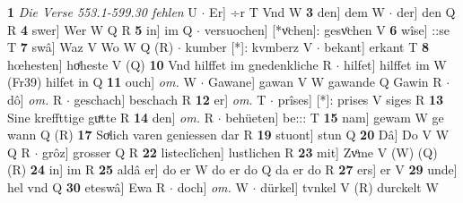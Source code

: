 \documentclass[8pt,a4paper,notitlepage]{article}
\begin{document}
\begin{table}[ht]
\begin{minipage}[t]{0.5\linewidth}
\textbf{1} \textit{Die Verse 553.1-599.30 fehlen} U   $\cdot$ Er] ÷r T Vnd W \textbf{3} den] dem W  $\cdot$ der] den Q R \textbf{4} swer] Wer W Q R \textbf{5} in] im Q  $\cdot$ versuochen] [*vͦchen]: gesvͦchen V \textbf{6} wîse] ::se T \textbf{7} swâ] Waz V Wo W Q (R)  $\cdot$ kumber [*]: kvmberz V  $\cdot$ bekant] erkant T \textbf{8} hœhesten] hoͤheste V (Q) \textbf{10} Vnd hilffet im gnedenkliche R  $\cdot$ hilfet] hilffet im W (Fr39) hilfet in Q \textbf{11} ouch] \textit{om.} W  $\cdot$ Gawane] gawan V W gawande Q Gawin R  $\cdot$ dô] \textit{om.} R  $\cdot$ geschach] beschach R \textbf{12} er] \textit{om.} T  $\cdot$ prîses] [*]: prises V siges R \textbf{13} Sine kreffttige guͯtte R \textbf{14} den] \textit{om.} R  $\cdot$ behüeten] be::: T \textbf{15} nam] gewam W ge wann Q (R) \textbf{17} Soͯlich varen geniessen dar R \textbf{19} stuont] stun Q \textbf{20} Dâ] Do V W Q R  $\cdot$ grôz] grosser Q R \textbf{22} listeclîchen] lustlichen R \textbf{23} mit] Zvͦme V (W) (Q) (R) \textbf{24} in] im R \textbf{25} aldâ er] do er W do er do Q da er do R \textbf{27} ers] er V \textbf{29} unde] hel vnd Q \textbf{30} eteswâ] Ewa R  $\cdot$ doch] \textit{om.} W  $\cdot$ dürkel] tvnkel V (R) durckelt W \newline
\end{minipage}
\end{table}
\end{document}
